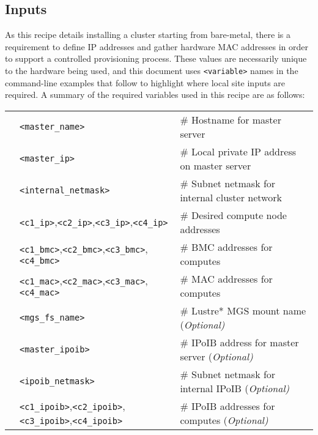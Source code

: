 \subsection{Inputs}
As this recipe details installing a cluster
starting from bare-metal, there is a requirement to define IP addresses and gather
hardware MAC addresses in order to support a controlled provisioning process. These values
are necessarily unique to the hardware being used, and this document uses \texttt{<variable>}
names in the command-line examples that follow to highlight where local site
inputs are required. A summary of the required variables used in this recipe
are as follows: \\

\vspace*{0.2cm}
\begin{tabular}{@{}>{\textbullet}cll@{}}
& \texttt{<master\_name>}  & {\small \# Hostname for master server} \\
& \texttt{<master\_ip>} & {\small \# Local private IP address on master server} \\
& \texttt{<internal\_netmask>} & {\small \# Subnet netmask for internal cluster network} \\
& \texttt{<c1\_ip>},\texttt{<c2\_ip>},\texttt{<c3\_ip>},\texttt{<c4\_ip>}
& {\small \# Desired compute node addresses} \\
& \texttt{<c1\_bmc>},\texttt{<c2\_bmc>},\texttt{<c3\_bmc>},\texttt{<c4\_bmc>}
& {\small \# BMC addresses for computes} \\
& \texttt{<c1\_mac>},\texttt{<c2\_mac>},\texttt{<c3\_mac>},\texttt{<c4\_mac>}
& {\small \# MAC addresses for computes} \\
& \texttt{<mgs\_fs\_name>} & {\small \# Lustre* MGS mount name (\em Optional)} \\
& \texttt{<master\_ipoib>} & {\small \# IPoIB address for master server (\em Optional)} \\
& \texttt{<ipoib\_netmask>} & {\small \# Subnet netmask for internal IPoIB (\em Optional)} \\
& \texttt{<c1\_ipoib>},\texttt{<c2\_ipoib>},\texttt{<c3\_ipoib>},\texttt{<c4\_ipoib>}
& {\small \# IPoIB addresses for computes (\em Optional)}\\

\end{tabular}
